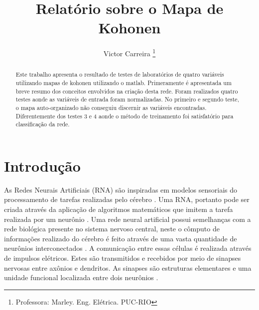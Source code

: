 \documentclass[journal, a4paper]{IEEEtran}
\begin{document}
	\title{Relatório sobre o Mapa de Kohonen}
	\author{Victor Carreira
	\thanks{Professora: Marley. Eng. Elétrica. PUC-RIO}}
	\maketitle

\begin{abstract}
 Este trabalho apresenta o resultado de testes de laboratórios de quatro variáveis utilizando mapas de kohonen utilizando o matlab. Primeramente é apresentada um breve resumo dos conceitos envolvidos na criação desta rede. Foram realizados quatro testes aonde as variáveis de entrada foram normalizadas. No primeiro e segundo teste, o mapa auto-organizado não conseguiu discernir as variáveis encontradas. Diferentemente dos testes 3 e 4 aonde o método de treinamento foi satisfatório para classificação da rede. 
\end{abstract}


\section{Introdução}
    As Redes Neurais Artificiais (RNA) são inspiradas em modelos sensoriais do processamento de tarefas realizadas pelo cérebro \citep{Hagan1996}. Uma RNA, portanto pode ser criada através da aplicação de algoritmos matemáticos que imitem a tarefa realizada por um neurônio \citep{Nedjah2016}. Uma rede neural artificial possui semelhanças com a rede biológica presente no sistema nervoso central, neste o cômputo de informações realizado do cérebro é feito através de uma vasta quantidade de neurônios interconectados \citep{Feldman1988,Poulton2002}. A comunicação entre essas células é realizada através de impulsos elétricos. Estes são transmitidos e recebidos por meio de sinapses nervosas entre axônios e dendritos. As sinapses são estruturas elementares e uma unidade funcional localizada entre dois neurônios \citep{Krogh2008}.

	
\end{document}
